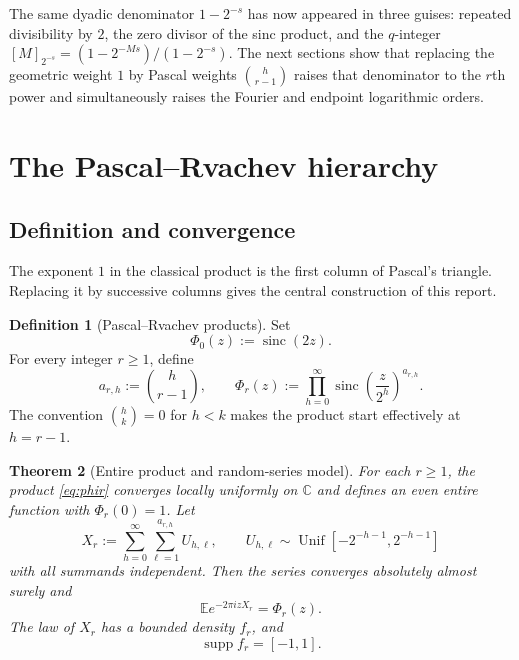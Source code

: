 \documentclass[11pt,a4paper]{article}
\theoremstyle{frontier}
\newtheorem{theorem}{Theorem}[section]
\theoremstyle{definition}
\newtheorem{definition}[theorem]{Definition}
\newcommand{\sinc}{\operatorname{sinc}}
\newcommand{\supp}{\operatorname{supp}}
\newcommand{\E}{\mathbb E}
\newcommand{\C}{\mathbb C}
\begin{document}
\begin{resultbox}
The same dyadic denominator $1-2^{-s}$ has now appeared in three guises: repeated divisibility by $2$, the zero divisor of the sinc product, and the $q$-integer $[M]_{2^{-s}}=(1-2^{-Ms})/(1-2^{-s})$.  The next sections show that replacing the geometric weight $1$ by Pascal weights $\binom h{r-1}$ raises that denominator to the $r$th power and simultaneously raises the Fourier and endpoint logarithmic orders.
\end{resultbox}

\section{The Pascal--Rvachev hierarchy}\label{sec:hierarchy}

\subsection{Definition and convergence}

The exponent $1$ in the classical product is the first column of Pascal's triangle.  Replacing it by successive columns gives the central construction of this report.

\begin{definition}[Pascal--Rvachev products]\label{def:pascal-rvachev}
Set
\begin{equation}\label{eq:phi0}
  \Phi_0(z):=\sinc(2z).
\end{equation}
For every integer $r\ge1$, define
\begin{equation}\label{eq:phir}
  a_{r,h}:=\binom h{r-1},
  \qquad
  \Phi_r(z):=\prod_{h=0}^{\infty}
  \sinc\!\left(\frac z{2^h}\right)^{a_{r,h}}.
\end{equation}
The convention $\binom hk=0$ for $h<k$ makes the product start effectively at $h=r-1$.
\end{definition}

\begin{theorem}[Entire product and random-series model]\label{thm:random-series}
For each $r\ge1$, the product \eqref{eq:phir} converges locally uniformly on $\C$ and defines an even entire function with $\Phi_r(0)=1$.  Let
\begin{equation}\label{eq:Xr}
  X_r:=\sum_{h=0}^{\infty}\sum_{\ell=1}^{a_{r,h}}U_{h,\ell},
  \qquad
  U_{h,\ell}\sim\operatorname{Unif}
  \!\left[-2^{-h-1},2^{-h-1}\right]
\end{equation}
with all summands independent.  Then the series converges absolutely almost surely and
\begin{equation}\label{eq:char-Xr}
  \E e^{-2\pi i zX_r}=\Phi_r(z).
\end{equation}
The law of $X_r$ has a bounded density $f_r$, and
\begin{equation}\label{eq:support}
  \supp f_r=[-1,1].
\end{equation}
\end{theorem}
\end{document}
